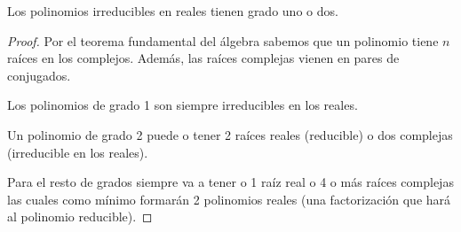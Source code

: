 \begin{thm}
    Los polinomios irreducibles en reales tienen grado uno o dos.
\end{thm}

\begin{proof}
    Por el teorema fundamental del álgebra sabemos que un polinomio tiene $n$ raíces en los complejos. Además, las raíces complejas vienen en pares de conjugados.

    Los polinomios de grado 1 son siempre irreducibles en los reales.

    Un polinomio de grado 2 puede o tener 2 raíces reales (reducible) o dos complejas (irreducible en los reales).

    Para el resto de grados siempre va a tener o 1 raíz real o 4 o más raíces complejas las cuales como mínimo formarán 2 polinomios reales (una factorización que hará al polinomio reducible).
\end{proof}
